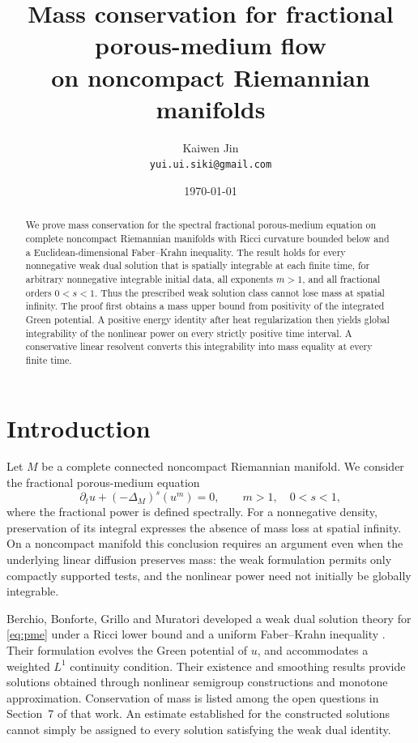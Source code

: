 \documentclass[11pt]{article}
\title{Mass conservation for fractional porous-medium flow\\
on noncompact Riemannian manifolds}
\author{Kaiwen Jin\\ \small\texttt{yui.ui.siki@gmail.com}}
\date{\today}
\theoremstyle{definition}
\theoremstyle{remark}
\begin{document}
\maketitle
\begin{abstract}
We prove mass conservation for the spectral fractional porous-medium
equation on complete noncompact Riemannian manifolds with Ricci curvature
bounded below and a Euclidean-dimensional Faber--Krahn inequality.
The result holds for every nonnegative weak dual solution that is
spatially integrable at each finite time, for arbitrary nonnegative
integrable initial data, all exponents \(m>1\), and all fractional
orders \(0<s<1\). Thus the prescribed weak solution class cannot lose
mass at spatial infinity. The proof first obtains a mass upper bound
from positivity of the integrated Green potential. A positive energy
identity after heat regularization then yields global integrability
of the nonlinear power on every strictly positive time interval.
A conservative linear resolvent converts this integrability into
mass equality at every finite time.
\end{abstract}

\section{Introduction}

Let \(M\) be a complete connected noncompact Riemannian manifold.
We consider the fractional porous-medium equation
\begin{equation}\label{eq:pme}
 \partial_tu+(-\Delta_M)^s(u^m)=0,\qquad m>1,\quad 0<s<1,
\end{equation}
where the fractional power is defined spectrally.
For a nonnegative density, preservation of its integral expresses
the absence of mass loss at spatial infinity. On a noncompact
manifold this conclusion requires an argument even when the
underlying linear diffusion preserves mass: the weak formulation
permits only compactly supported tests, and the nonlinear power
need not initially be globally integrable.

Berchio, Bonforte, Grillo and Muratori developed a weak dual solution
theory for \eqref{eq:pme} under a Ricci lower bound and a uniform
Faber--Krahn inequality \cite{BBGM}. Their formulation evolves the
Green potential of \(u\), and accommodates a weighted \(L^1\)
continuity condition. Their existence and smoothing results provide
solutions obtained through nonlinear semigroup constructions and
monotone approximation. Conservation of mass is listed among the
open questions in Section~7 of that work. An estimate established
for the constructed solutions cannot simply be assigned to every
solution satisfying the weak dual identity.
\end{document}
